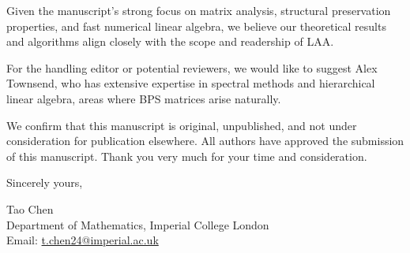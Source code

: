 \documentclass[11pt]{article}
\begin{document}
Given the manuscript's strong focus on matrix analysis, structural preservation properties, and fast numerical linear algebra, we believe our theoretical results and algorithms align closely with the scope and readership of LAA.

For the handling editor or potential reviewers, we would like to suggest Alex Townsend, who has extensive expertise in spectral methods and hierarchical linear algebra, areas where BPS matrices arise naturally. 

We confirm that this manuscript is original, unpublished, and not under consideration for publication elsewhere. All authors have approved the submission of this manuscript. Thank you very much for your time and consideration.

\vspace{1.0em}
Sincerely yours,

\vspace{2.0em} 
Tao Chen \\
Department of Mathematics, Imperial College London \\
Email: \href{mailto:t.chen24@imperial.ac.uk}{t.chen24@imperial.ac.uk}
\end{document}
